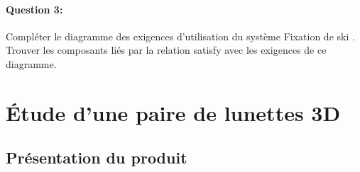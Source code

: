 \paragraph{Question 3:} Compléter le diagramme des exigences d'utilisation du système \og Fixation de ski \fg. Trouver les composants liés par la relation \og satisfy \fg avec les exigences de ce diagramme.

\begin{center}
\end{center}

\newpage

\section{Étude d'une paire de lunettes 3D}

\subsection{Présentation du produit}

